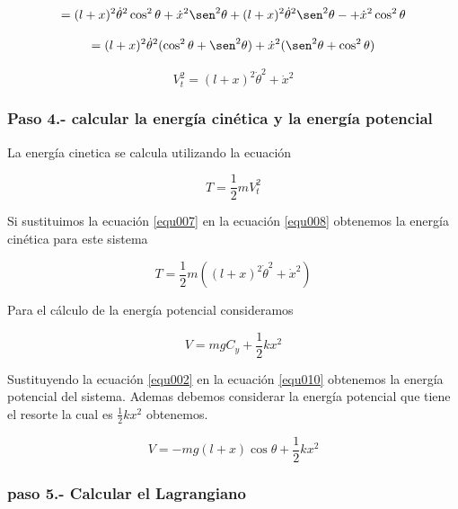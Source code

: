 \documentclass[12pt]{book}
\theoremstyle{definition}
\theoremstyle{remark}
\theoremstyle{plain}
\begin{document}
\begin{equation*}
=  (l+x)^2 \dot{\theta} ^2 \cos ^2 \theta+ \dot{x} ^2 \sen ^2 \theta  +  (l+x) ^2 \dot{\theta} ^2 \sen ^2 \theta-+ \dot{x} ^2 \cos ^2 \theta
\end{equation*}

\begin{equation*}
=  (l+x)^2 \dot{\theta} ^2 ( \cos ^2 \theta+  \sen ^2 \theta)+ \dot{x} ^2 ( \sen ^2 \theta+ \cos ^2 \theta)
\end{equation*}


\begin{equation}
\label{equ007}
V_t ^2=  (l+x)^2 \dot{\theta} ^2 + \dot{x} ^2 
\end{equation}

\subsubsection{Paso 4.- calcular la energía cinética y la energía potencial}
La energía cinetica se calcula utilizando la ecuación

\begin{equation}
\label{equ008}
T = \frac{1}{2}m V_t ^2
\end{equation}

Si sustituimos la ecuación \ref{equ007} en la ecuación \ref{equ008} obtenemos la energía cinética para este sistema

\begin{equation}
\label{equ009}
T = \frac{1}{2}m (  (l+x)^2 \dot{\theta} ^2 +\dot{x} ^2 )
\end{equation}

Para el cálculo de la energía potencial consideramos 

\begin{equation}
\label{equ010}
V = m g C_y +\frac{1}{2} k x^2
\end{equation}
 
 Sustituyendo la ecuación \ref{equ002} en la ecuación \ref{equ010} obtenemos la energía potencial del sistema. Ademas debemos considerar la energía potencial que tiene el resorte la cual es $\frac{1}{2} k x^2$ obtenemos.

\begin{equation}
\label{equ011}
V = - m g (l+x) \cos \theta+\frac{1}{2} k x^2
\end{equation}

\subsubsection{paso 5.- Calcular el Lagrangiano}
\end{document}
